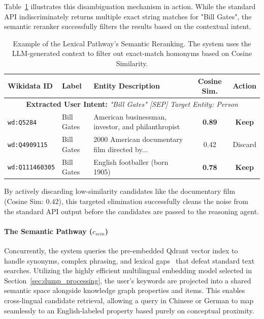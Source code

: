 Table~\ref{tab:semantic_reranking} illustrates this disambiguation mechanism in action. While the standard API indiscriminately returns multiple exact string matches for "Bill Gates", the semantic reranker successfully filters the results based on the contextual intent.

\begin{table}[htbp]
\centering
\small 
\caption{Example of the Lexical Pathway's Semantic Reranking. The system uses the LLM-generated context to filter out exact-match homonyms based on Cosine Similarity.}
\label{tab:semantic_reranking}
\begin{tabular}{p{2cm} p{1.8cm} p{5.2cm} c c} 
\hline
\textbf{Wikidata ID} & \textbf{Label} & \textbf{Entity Description} & \textbf{Cosine Sim.} & \textbf{Action} \\
\hline
\multicolumn{5}{c}{\textbf{Extracted User Intent:} \textit{"Bill Gates" [SEP] Target Entity: Person}} \\
\hline
\texttt{wd:Q5284} & Bill Gates & American businessman, investor, and philanthropist & \textbf{0.89} & \textbf{Keep} \\
\texttt{wd:Q4909115} & Bill Gates & 2000 American documentary film directed by... & 0.42 & Discard \\
\texttt{wd:Q111460305}& Bill Gates & English footballer (born 1905) & \textbf{0.78} & \textbf{Keep} \\
\hline
\end{tabular}
\end{table}

By actively discarding low-similarity candidates like the documentary film (Cosine Sim: $0.42$), this targeted elimination successfully cleans the noise from the standard API output before the candidates are passed to the reasoning agent.

\paragraph{The Semantic Pathway ($c_{sem}$)} 
Concurrently, the system queries the pre-embedded Qdrant vector index to handle synonyms, complex phrasing, and lexical gaps~\cite{hoffner_survey_2017} that defeat standard text searches. Utilizing the highly efficient multilingual embedding model selected in Section~\ref{sec:dump_processing}, the user's keywords are projected into a shared semantic space alongside knowledge graph properties and items. This enables cross-lingual candidate retrieval, allowing a query in Chinese or German to map seamlessly to an English-labeled property based purely on conceptual proximity.

